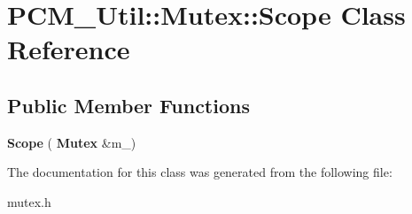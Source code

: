 \section{P\+C\+M\+\_\+\+Util\+:\+:Mutex\+:\+:Scope Class Reference}
\label{classPCM__Util_1_1Mutex_1_1Scope}
\subsection*{Public Member Functions}
\begin{DoxyCompactItemize}
\item 
\mbox{\label{classPCM__Util_1_1Mutex_1_1Scope_aaf42d670b42a014200ad176d60d7c226}} 
{\bfseries Scope} (\textbf{ Mutex} \&m\+\_\+)
\end{DoxyCompactItemize}


The documentation for this class was generated from the following file\+:\begin{DoxyCompactItemize}
\item 
mutex.\+h\end{DoxyCompactItemize}
